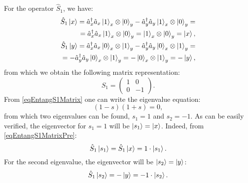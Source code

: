 For the operator $\hat{S}_1$, we have:
\begin{eqnarray}
\hat{S}_1 \ket{x} = \hat{a}_x^{\dag} \hat{a}_x
\ket{1}_x\otimes\ket{0}_y - \hat{a}_y^{\dag}
\hat{a}_y\ket{1}_x\otimes\ket{0}_y =
\nonumber \\
= 
\hat{a}_x^{\dag} \hat{a}_x
\ket{1}_x\otimes\ket{0}_y =
\ket{1}_x\otimes\ket{0}_y = \ket{x},
\nonumber \\
\hat{S}_1 \ket{y} = \hat{a}_x^{\dag} \hat{a}_x
\ket{0}_x\otimes\ket{1}_y - \hat{a}_y^{\dag}
\hat{a}_y\ket{0}_x\otimes\ket{1}_y =
\nonumber \\
=
-\hat{a}_y^{\dag}
\hat{a}_y\ket{0}_x\otimes\ket{1}_y
=-\ket{0}_x\otimes\ket{1}_y = -\ket{y},
\label{eqEntangS1MatrixPre}
\end{eqnarray}
from which we obtain the following matrix representation:
\begin{equation}
\hat{S}_1 = 
\left(
\begin{array}{cc}
1 & 0 \\
0 & -1 
\end{array}
\right).
\label{eqEntangS1Matrix}
\end{equation}
From \eqref{eqEntangS1Matrix} one can write the eigenvalue equation:
\[
\left(1-s\right)\left(1 + s\right) = 0,
\]
from which two eigenvalues can be found, $s_1 = 1$ and
$s_2 = -1$. As can be easily verified, the eigenvector for $s_1 = 1$
will be $\ket{s_1} = \ket{x}$. Indeed, from \eqref{eqEntangS1MatrixPre}:
\begin{equation}
\hat{S}_1 \ket{s_1} = \hat{S}_1 \ket{x} = 1 \cdot \ket{s_1}.
\label{eq:part2:pol:stocks_s1_1}
\end{equation}
For the second eigenvalue, the eigenvector will be
$\ket{s_2} = \ket{y}$:
\begin{equation}
\hat{S}_1 \ket{s_2}  = - \ket{y} = -1 \cdot \ket{s_2}.
\label{eq:part2:pol:stocks_s1_2}
\end{equation}



